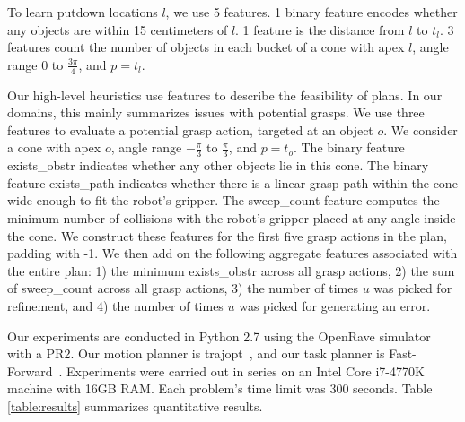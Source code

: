 To learn putdown locations $l$, we use 5 features. 1 binary feature encodes whether
any objects are within 15 centimeters of $l$. 1 feature is the
distance from $l$ to $t_{l}$. 3 features count the number of objects
in each bucket of a cone with apex $l$, angle range 0 to $\frac{3\pi}{4}$, and $p = t_{l}$.

Our high-level heuristics use features to describe the feasibility of
plans. In our domains, this mainly summarizes issues with potential
grasps. We use three features to evaluate a potential grasp action,
targeted at an object $o$. We consider a cone with apex $o$, angle range
$-\frac{\pi}{3}$ to $\frac{\pi}{3}$, and $p = t_{o}$. The
binary feature exists\_obstr indicates whether any
other objects lie in this cone. The binary feature exists\_path
indicates whether there is a linear grasp path within the cone wide
enough to fit the robot's gripper. The
sweep\_count feature computes the minimum number of collisions with the robot's
gripper placed at any angle inside the cone.
We construct these features for the first five grasp actions in the
plan, padding with -1. We then add on the following
aggregate features associated with the entire plan: 1) the minimum
exists\_obstr across all grasp actions, 2) the sum of sweep\_count
across all grasp actions, 3) the number of times $u$ was picked for
refinement, and 4) the number of times $u$ was picked for generating
an error.

Our experiments are conducted in Python 2.7 using the OpenRave
simulator~\cite{Diankov_2008_6117} with a PR2.  Our motion planner is
trajopt~\cite{schulman2013finding}, and our task planner is
Fast-Forward~\cite{FF}. Experiments were carried out in series on an
Intel Core i7-4770K machine with 16GB RAM. Each problem's time limit
was 300 seconds. Table \ref{table:results} summarizes quantitative
results.

